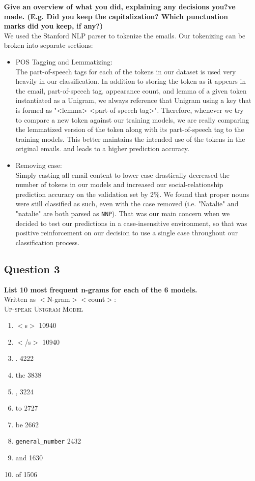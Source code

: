 \documentclass{article} %
\begin{document}
\textbf{Give an overview of what you did, explaining any decisions you?ve made. (E.g. Did you keep the capitalization? Which punctuation marks did you keep, if any?)}
\\


We used the Stanford NLP parser to tokenize the emails. Our tokenizing can be broken into separate sections:\\
\begin{itemize}
\item POS Tagging and Lemmatizing:\\
The part-of-speech tags for each of the tokens in our dataset is used very heavily in our classification. In addition to storing the token as it appears in the email, part-of-speech tag, appearance count, and lemma of a given token instantiated as a Unigram, we always reference that Unigram using a key that is formed as "<lemma> <part-of-speech tag>". Therefore, whenever we try to compare a new token against our training models, we are really comparing the lemmatized version of the token along with its part-of-speech tag to the training models. This better maintains the intended use of the tokens in the original emails. and leads to a higher prediction accuracy.
\item Removing case:\\
Simply casting all email content to lower case drastically decreased the number of tokens in our models and increased our social-relationship prediction accuracy on the validation set by 2\%. We found that proper nouns were still classified as such, even with the case removed (i.e. "Natalie" and "natalie" are both parsed as \texttt{NNP}). That was our main concern when we decided to test our predictions in a case-insensitive environment, so that was positive reinforcement on our decision to use a single case throughout our classification process.
\end{itemize}

\subsection*{Question 3}

\textbf{List 10 most frequent n-grams for each of the 6 models.}
\\

Written as $<$N-gram$> <$count$>$:\\

\textsc{Up-speak Unigram Model}\\
\begin{enumerate}
\item $<$s$>$ 10940
\item $<$/s$>$ 10940
\item . 4222
\item the 3838
\item , 3224
\item to 2727
\item be 2662
\item \texttt{general\_number} 2432
\item and 1630
\item of 1506
\end{enumerate}
\end{document}
